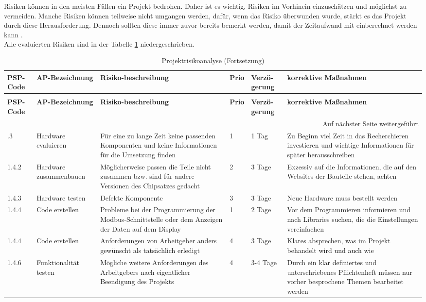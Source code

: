 Risiken können in den meisten Fällen ein Projekt bedrohen. Daher ist es wichtig, Risiken im Vorhinein einzuschätzen und möglichst zu vermeiden. Manche Risiken können teilweise nicht umgangen werden, dafür, wenn das Risiko überwunden wurde, stärkt es das Projekt durch diese Herausforderung. Dennoch sollten diese immer zuvor bereits bemerkt werden, damit der Zeitaufwand mit einberechnet werden kann \cite[vgl.][]{timetrackapp:2021}. \\
Alle evaluierten Risiken sind in der Tabelle \ref{tab:risikoanalyse} niedergeschrieben.

\begin{longtable}{p{} | p{} | p{} | p{} | p{} | p{}}
	\caption{Projektrisikoanalyse}
	\label{tab:risikoanalyse}
	\\ \toprule
	\textbf{PSP-Code} & \textbf{AP-Bezeichnung} & \textbf{Risiko-beschreibung} & \textbf{Prio} & \textbf{Verzö-gerung} & \textbf{korrektive Maßnahmen}
	\\ \midrule
	\endfirsthead
	\caption{Projektrisikoanalyse (Fortsetzung)}
	\\ \toprule
		\textbf{PSP-Code} & \textbf{AP-Bezeichnung} & \textbf{Risiko-beschreibung} & \textbf{Prio} & \textbf{Verzö-gerung} & \textbf{korrektive Maßnahmen}
	\\ \midrule
	\endhead
	\midrule
	\multicolumn{6}{r}{{Auf nächster Seite weitergeführt}} 
	\\ \bottomrule
	\endfoot
	\bottomrule
	\endlastfoot
	1.3.3 & Hardware evaluieren &  Für eine zu lange Zeit keine passenden Komponenten und keine Informationen für die Umsetzung finden & 1 & 1 Tag & Zu Beginn viel Zeit in das Recherchieren investieren und wichtige Informationen für später herausschreiben \\ \midrule
	1.4.2 & Hardware zusammenbauen & Möglicherweise passen die Teile nicht zusammen bzw. sind für andere Versionen des Chipsatzes gedacht & 2 & 3 Tage & Exzessiv auf die Informationen, die auf den Websites der Bauteile stehen, achten  \\ \midrule
	1.4.3 & Hardware testen & Defekte Komponente & 3 & 3 Tage & Neue Hardware muss bestellt werden \\ 
	1.4.4 & Code erstellen & Probleme bei der Programmierung der Modbus-Schnittstelle oder dem Anzeigen der Daten auf dem Display & 1 & 2 Tage & Vor dem Programmieren informieren und nach Libraries suchen, die die Einstellungen vereinfachen \\ \midrule
	1.4.4 & Code erstellen & Anforderungen von Arbeitgeber anders gewünscht als tatsächlich erledigt & 4 & 3 Tage & Klares absprechen, was im Projekt behandelt wird und auch wie \\ \midrule
	1.4.6 & Funktionalität testen & Mögliche weitere Anforderungen des Arbeitgebers nach eigentlicher Beendigung des Projekts  & 4 & 3-4 Tage & Durch ein klar definiertes und unterschriebenes Pflichtenheft müssen nur vorher besprochene Themen bearbeitet werden \\
\end{longtable}